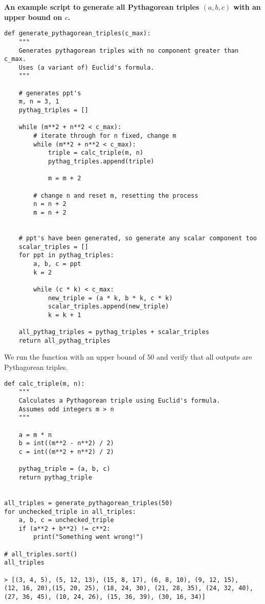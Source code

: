 \documentclass[12pt]{article}
\begin{document}
\pagebreak 
\noindent \textbf{An example script to generate all Pythagorean triples $(a, b, c)$ with an upper bound on $c$.}

\begin{verbatim}
def generate_pythagorean_triples(c_max):
    """
    Generates pythagorean triples with no component greater than c_max.
    Uses (a variant of) Euclid's formula.
    """

    # generates ppt's
    m, n = 3, 1
    pythag_triples = []

    while (m**2 + n**2 < c_max):
        # iterate through for n fixed, change m
        while (m**2 + n**2 < c_max):
            triple = calc_triple(m, n)
            pythag_triples.append(triple)

            m = m + 2

        # change n and reset m, resetting the process
        n = n + 2
        m = n + 2 


    # ppt's have been generated, so generate any scalar component too
    scalar_triples = []
    for ppt in pythag_triples:
        a, b, c = ppt
        k = 2

        while (c * k) < c_max:
            new_triple = (a * k, b * k, c * k)
            scalar_triples.append(new_triple)
            k = k + 1
            
    all_pythag_triples = pythag_triples + scalar_triples
    return all_pythag_triples
\end{verbatim}
We run the function with an upper bound of $50$ and verify that all outputs are Pythagorean triples.
\begin{verbatim}
def calc_triple(m, n):
    """
    Calculates a Pythagorean triple using Euclid's formula.
    Assumes odd integers m > n
    """
    
    a = m * n
    b = int((m**2 - n**2) / 2)
    c = int((m**2 + n**2) / 2)

    pythag_triple = (a, b, c)
    return pythag_triple


all_triples = generate_pythagorean_triples(50)
for unchecked_triple in all_triples:
    a, b, c = unchecked_triple
    if (a**2 + b**2) != c**2:
        print("Something went wrong!")

# all_triples.sort()
all_triples

> [(3, 4, 5), (5, 12, 13), (15, 8, 17), (6, 8, 10), (9, 12, 15), 
(12, 16, 20),(15, 20, 25), (18, 24, 30), (21, 28, 35), (24, 32, 40), 
(27, 36, 45), (10, 24, 26), (15, 36, 39), (30, 16, 34)]


\end{verbatim}

\pagebreak 

\nocite{*}
\printbibliography{}
\end{document}
